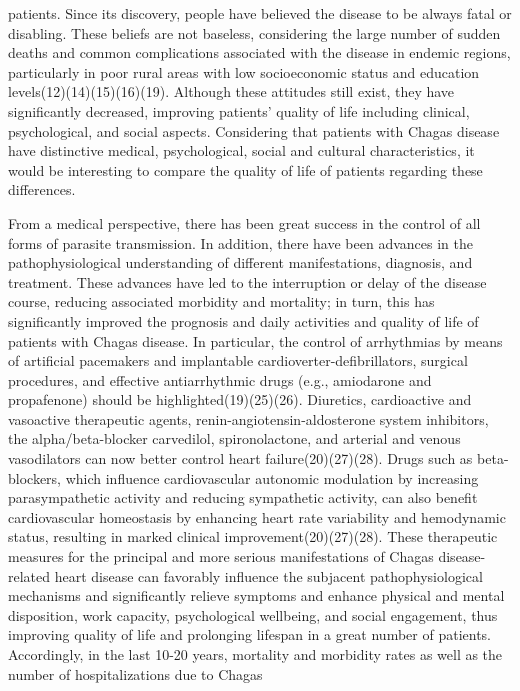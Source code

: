  patients. Since its discovery, people have believed the disease to be always fatal or
 disabling. These beliefs are not baseless, considering the large number of sudden deaths
 and common complications associated with the disease in endemic regions, particularly in
 poor rural areas with low socioeconomic status and education levels(12)(14)(15)(16)(19). Although these attitudes still exist, they
 have significantly decreased, improving patients' quality of life including clinical,
 psychological, and social aspects. Considering that patients with Chagas disease have
 distinctive medical, psychological, social and cultural characteristics, it would be
 interesting to compare the quality of life of patients regarding these differences. \par From a medical perspective, there has been great success in the control of all forms of
 parasite transmission. In addition, there have been advances in the pathophysiological
 understanding of different manifestations, diagnosis, and treatment. These advances have
 led to the interruption or delay of the disease course, reducing associated morbidity
 and mortality; in turn, this has significantly improved the prognosis and daily
 activities and quality of life of patients with Chagas disease. In particular, the
 control of arrhythmias by means of artificial pacemakers and implantable
 cardioverter-defibrillators, surgical procedures, and effective antiarrhythmic drugs
 (e.g., amiodarone and propafenone) should be highlighted(19)(25)(26). Diuretics, cardioactive and vasoactive
 therapeutic agents, renin-angiotensin-aldosterone system inhibitors, the
 alpha/beta-blocker carvedilol, spironolactone, and arterial and venous vasodilators can
 now better control heart failure(20)(27)(28). Drugs such as beta-blockers, which
 influence cardiovascular autonomic modulation by increasing parasympathetic activity and
 reducing sympathetic activity, can also benefit cardiovascular homeostasis by enhancing
 heart rate variability and hemodynamic status, resulting in marked clinical
 improvement(20)(27)(28). These therapeutic measures for the
 principal and more serious manifestations of Chagas disease-related heart disease can
 favorably influence the subjacent pathophysiological mechanisms and significantly
 relieve symptoms and enhance physical and mental disposition, work capacity,
 psychological wellbeing, and social engagement, thus improving quality of life and
 prolonging lifespan in a great number of patients. Accordingly, in the last 10-20 years,
 mortality and morbidity rates as well as the number of hospitalizations due to Chagas
